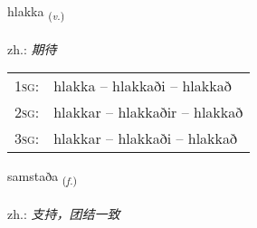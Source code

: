 \documentclass[frontgrid, backgrid]{flacards}\usepackage[]{graphicx}\usepackage[]{xcolor}
\begin{document}
\renewcommand{\flhead}{\vskip5pt \fboxsep=0pt {\small\bfseries\footnotesize Sagnorð | 动词}}
\renewcommand{\fcfoot}{\vskip5pt \fboxsep=0pt \hspace{2pt}{\small\bfseries\footnotesize 3K}}

\renewcommand{\blhead}{\vskip5pt {\small\bfseries\footnotesize Sagnorð | 动词 }}
\renewcommand{\bcfoot}{\vskip5pt \hspace{2pt}{\small\bfseries\footnotesize 3K}}


{hlakka \small{\textsubscript{(\textit{v.})}} \\[1ex] %
\textphonetic{[l̥ahka]} \\
zh.: \emph{期待} \\  [2ex]
\renewcommand*{\arraystretch}{0.8}
\begin{tabular}{p{1cm}l}
\textsc{1sg}: & hlakka -- hlakkaði -- hlakkað \\ 
\textsc{2sg}: & hlakkar -- hlakkaðir -- hlakkað \\ 
\textsc{3sg}: & hlakkar -- hlakkaði -- hlakkað \\ 
\end{tabular}
}

\renewcommand{\flhead}{\vskip5pt \fboxsep=0pt {\small\bfseries\footnotesize Nafnorð | 名词}}
\renewcommand{\fcfoot}{\vskip5pt \fboxsep=0pt \hspace{2pt}{\small\bfseries\footnotesize 3K}}

\renewcommand{\blhead}{\vskip5pt {\small\bfseries\footnotesize Nafnorð | 名词 }}
\renewcommand{\bcfoot}{\vskip5pt \hspace{2pt}{\small\bfseries\footnotesize 3K}}


{samstaða \small{\textsubscript{(\textit{f.})}} \\[1ex] %
\textphonetic{[samstaða]} \\
zh.: \emph{支持，团结一致} \\  [2ex]
\renewcommand*{\arraystretch}{0.8}
}
\end{document}
